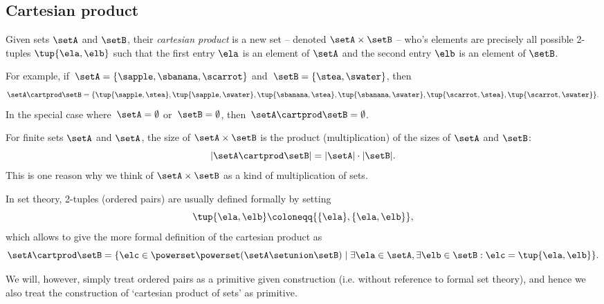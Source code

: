 \subsection{Cartesian product}\label{sec:cartesian-product}

Given sets $\setA$ and $\setB$, their \emph{cartesian product} is a new set -- denoted $\setA \times \setB$ -- who's elements are precisely all possible 2-tuples $\tup{\ela, \elb}$ such that the first entry $\ela$ is an element of $\setA$ and the second entry $\elb$ is an element of $\setB$.

For example, if~$\setA = \{ \sapple, \sbanana, \scarrot\}$ and~$\setB = \{ \stea, \swater \}$, then
\begin{equation*}
    \setA \cartprod \setB = \{ \tup{\sapple, \stea}, \tup{\sapple, \swater}, \tup{\sbanana, \stea}, \tup{\sbanana, \swater},  \tup{\scarrot, \stea}, \tup{\scarrot, \swater}\}.
\end{equation*}
In the special case where~$\setA = \emptyset$ or~$\setB = \emptyset$, then~$\setA \cartprod \setB = \emptyset$.

\begin{remark}
    For finite sets $\setA$ and $\setA$, the size of $\setA \times \setB$ is the product (multiplication) of the sizes of $\setA$ and $\setB$:
    \begin{equation}
        \vert \setA \cartprod \setB \vert = \vert \setA \vert \cdot \vert \setB \vert.
    \end{equation}
    This is one reason why we think of $\setA \times \setB$ as a kind of multiplication of sets.
\end{remark}

In set theory, 2-tuples (ordered pairs) are usually defined formally by setting
\begin{equation}
    \label{eq:ordered-pair}
    \tup{\ela, \elb} \coloneqq \{ \{\ela \} , \{ \ela, \elb \} \},
\end{equation}
which allows to give the more formal definition of the cartesian product as
\begin{equation}
    \setA \cartprod \setB = \{ \elc \in \powerset \powerset (\setA \setunion \setB) \mid \exists \ela \in \setA, \exists \elb \in \setB : \elc = \tup{\ela, \elb} \}.
\end{equation}

We will, however, simply treat ordered pairs as a primitive given construction (i.e. without reference to formal set theory), and hence we also treat the construction of `cartesian product of sets' as primitive.

